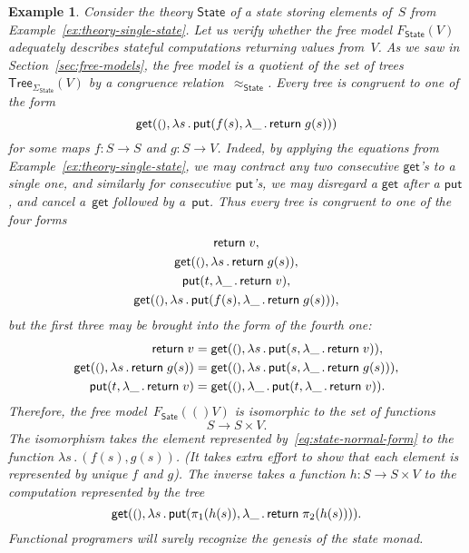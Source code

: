 \documentclass{amsart}
\newcommand{\theory}[1]{\mathsf{#1}} %
\newcommand{\signature}[1]{\Sigma_{\theory{#1}}} %
\newcommand{\Free}[2]{F_{\theory{#1}}(#2)} %
\newcommand{\lam}[1]{\lambda #1 \,.\,}
\newcommand{\Tree}[2]{\mathsf{Tree}_{#1}(#2)} %
\newcommand{\unit}{{\text{\small$()$}}} %
\newcommand{\kode}[1]{\mathsf{#1}}
\newcommand{\opcall}[3]{\kode{#1}(#2, #3)}
\newcommand{\return}[1]{\kode{return}\;#1}
\newtheorem{example}{Example}[section]
\begin{document}
\begin{example}
  Consider the theory $\theory{State}$ of a state storing elements of~$S$ from
  Example~\ref{ex:theory-single-state}. Let us verify whether the free model
  $\Free{State}{V}$ adequately describes stateful computations returning values
  from~$V$. As we saw in Section~\ref{sec:free-models}, the free model is a
  quotient of the set of trees $\Tree{\signature{State}}{V}$ by a congruence
  relation~$\approx_{\theory{State}}$. Every tree is congruent to one of the
  form
  \begin{equation}
    \label{eq:state-normal-form}
    \opcall{get}{\unit}{
      \lam{s} \opcall{put}{f(s)}{\lam{\_} \return{g(s)}}
    }
  \end{equation}
  for some maps $f : S \to S$ and $g : S \to V$. Indeed, by applying the
  equations from Example~\ref{ex:theory-single-state}, we may contract any two
  consecutive $\kode{get}$'s to a single one, and similarly for consecutive
  $\kode{put}$'s, we may disregard a $\kode{get}$ after a $\kode{put}$, and
  cancel a~$\kode{get}$ followed by a~$\kode{put}$. Thus every tree is congruent
  to one of the four forms
  \begin{gather*}
    \return{v},\\
    \opcall{get}{\unit}{\lam{s} \return{g(s)}},\\
    \opcall{put}{t}{\lam{\_} \return{v}},\\
    \opcall{get}{\unit}{
      \lam{s} \opcall{put}{f(s)}{\lam{\_} \return{g(s)}}
    },
  \end{gather*}
  but the first three may be brought into the form of the fourth one:
  \begin{align*}
    \return{v} &= 
    \opcall{get}{\unit}{\lam{s} \opcall{put}{s}{\lam{\_} \return{v}}},
    \\
    \opcall{get}{\unit}{\lam{s} \return{g(s)}} &=
    \opcall{get}{\unit}{\lam{s} \opcall{put}{s}{\lam{\_} \return{g(s)}}},
    \\
    \opcall{put}{t}{\lam{\_} \return{v}} &=
    \opcall{get}{\unit}{\lam{\_} \opcall{put}{t}{\lam{\_} \return{v}}}.
  \end{align*}
  Therefore, the free model~$\Free{Sate}(V)$ is isomorphic to the set of
  functions
  \begin{equation*}
    S \to S \times V.
  \end{equation*}
  The isomorphism takes the element represented by~\eqref{eq:state-normal-form}
  to the function $\lam{s} (f(s), g(s))$. (It takes extra effort to show that
  each element is represented by unique $f$ and $g$). The inverse takes a
  function $h : S \to S \times V$ to the computation represented by the tree
  \begin{equation*}
    \opcall{get}{\unit}{
      \lam{s} \opcall{put}{\pi_1(h(s))}{\lam{\_} \return{\pi_2(h(s))}}
    }.
  \end{equation*}
  Functional programers will surely recognize the genesis of the state monad.
\end{example}
\end{document}
